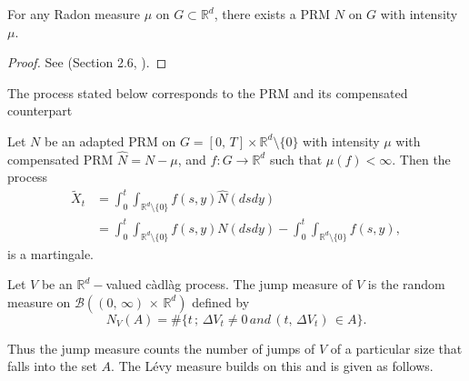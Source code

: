 \begin{proposition}
For any Radon measure $\mu$ on $G \subset \mathbb{R}^d$, there exists a PRM $N$ on $G$ with intensity $\mu$. 
\end{proposition}
\begin{proof}
See (Section 2.6, ).
\end{proof}
The process stated below corresponds to the PRM and its compensated counterpart
\begin{proposition}
Let $N$ be an adapted PRM on $G = [0, \, T] \times \mathbb{R}^d \setminus \{0\}$ with intensity $\mu$ with compensated PRM $\hat{N} = N - \mu$, and $f : G \to \mathbb{R}^d$  such that $\mu(f) < \infty$. Then the process
\begin{equation}
    \begin{split}
        \tilde{X}_t &= \int^t_0 \int_{\mathbb{R}^d \setminus \{0\}} f(s, y) \hat{N}(ds dy)\\
        &= \int^t_0 \int_{\mathbb{R}^d \setminus \{0\}} f(s, y) N(ds dy) - \int^t_0 \int_{\mathbb{R}^d \setminus \{0\}} f(s, y),
    \end{split}
\end{equation}
is a martingale.
\end{proposition}
\begin{definition}
Let $V$ be  an $\mathbb{R}^d-$valued c\`adl\`ag process. The jump measure of $V$ is the random measure on $\mathcal{B}((0, \, \infty) \, \times \, \mathbb{R}^d)$ defined by 
\begin{equation}\label{eq_Jmeasure}
    N_V(A) = \# \{t \, ; \, \Delta V_t \neq 0 \, and  \, (t, \, \Delta V_t) \, \in A \}.
\end{equation}
\end{definition}

Thus the jump measure counts the number of jumps of $V$ of a particular size that falls into the set $A$. The L\'evy measure builds on this and is given as follows.

